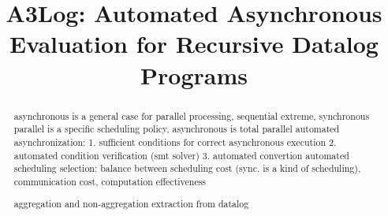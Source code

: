 \documentclass{vldb}
\begin{document}
%
\title{A3Log: Automated Asynchronous Evaluation for Recursive Datalog Programs}



%
\author{}

\maketitle


\begin{abstract}


asynchronous is a general case for parallel processing, sequential extreme, synchronous parallel is a specific scheduling policy, asynchronous is total parallel
automated asynchronization: 1. sufficient conditions for correct asynchronous execution 2. automated condition verification (smt solver) 3. automated convertion
automated scheduling selection: balance between scheduling cost (sync. is a kind of scheduling), communication cost, computation effectiveness

aggregation and non-aggregation extraction from datalog

\end{abstract}
\end{document}
